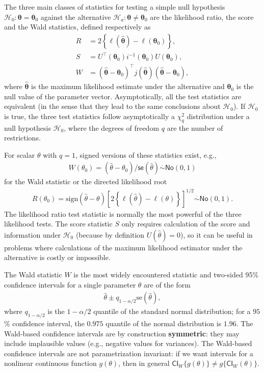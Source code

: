\documentclass[
  11pt,
  letterpaper,
]{book}
\theoremstyle{definition}
\theoremstyle{definition}
\theoremstyle{definition}
\theoremstyle{definition}
\theoremstyle{remark}
\begin{document}
The three main classes of statistics for testing a simple null hypothesis \(\mathscr{H}_0: \boldsymbol{\theta}=\boldsymbol{\theta}_0\) against the alternative \(\mathscr{H}_a: \boldsymbol{\theta} \neq \boldsymbol{\theta}_0\) are the likelihood ratio, the score and the Wald statistics, defined respectively as
\begin{align*}
 R &= 2 \left\{ \ell(\widehat{\boldsymbol{\theta}})-\ell(\boldsymbol{\theta}_0)\right\}, \\
 S &= U^\top(\boldsymbol{\theta}_0)i^{-1}(\boldsymbol{\theta}_0)U(\boldsymbol{\theta}_0), \\
 W &= (\widehat{\boldsymbol{\theta}}-\boldsymbol{\theta}_0)^\top j(\widehat{\boldsymbol{\theta}})(\widehat{\boldsymbol{\theta}}-\boldsymbol{\theta}_0),
\end{align*}
where \(\widehat{\boldsymbol{\theta}}\) is the maximum likelihood estimate under the alternative and \(\boldsymbol{\theta}_0\) is the null value of the parameter vector. Asymptotically, all the test statistics are equivalent (in the sense that they lead to the same conclusions about \(\mathscr{H}_0\)).
If \(\mathscr{H}_0\) is true, the three test statistics follow asymptotically a \(\chi^2_q\) distribution under a null hypothesis \(\mathscr{H}_0\), where the degrees of freedom \(q\) are the number of restrictions.

For scalar \(\theta\) with \(q=1\), signed versions of these statistics exist, e.g., \begin{align*}
W(\theta_0)=(\widehat{\theta}-\theta_0)/\mathsf{se}(\widehat{\theta})\stackrel{\cdot}{\sim} \mathsf{No}(0,1)
\end{align*}
for the Wald statistic or the directed likelihood root
\begin{align*}
R({\theta_0}) = \mathrm{sign}(\widehat{\theta}-\theta)\left[2
\left\{\ell(\widehat{\theta})-\ell(\theta)\right\}\right]^{1/2} \stackrel{\cdot}{\sim} \mathsf{No}(0,1).
\end{align*}
The likelihood ratio test statistic is normally the most powerful of the three likelihood tests. The score statistic \(S\) only requires calculation of the score and information under \(\mathscr{H}_0\) (because by definition \(U(\widehat{\theta})=0\)), so it can be useful in problems where calculations of the maximum likelihood estimator under the alternative is costly or impossible.

The Wald statistic \(W\) is the most widely encountered statistic and two-sided 95\% confidence intervals for a single parameter \(\theta\) are of the form
\begin{align*}
\widehat{\theta} \pm q_{1-\alpha/2}\mathrm{se}(\widehat{\theta}),
\end{align*}
where \(q_{1-\alpha/2}\) is the \(1-\alpha/2\) quantile of the standard normal distribution; for a \(95\)\% confidence interval, the \(0.975\) quantile of the normal distribution is \(1.96\).
The Wald-based confidence intervals are by construction \textbf{symmetric}: they may include implausible values (e.g., negative values for variances). The Wald-based confidence intervals are not parametrization invariant: if we want intervals for a nonlinear continuous function \(g(\theta)\), then in general
\(\mathsf{CI}_{W}\{g(\theta)\} \neq g\{\mathsf{CI}_{W}(\theta)\}.\)
\end{document}
